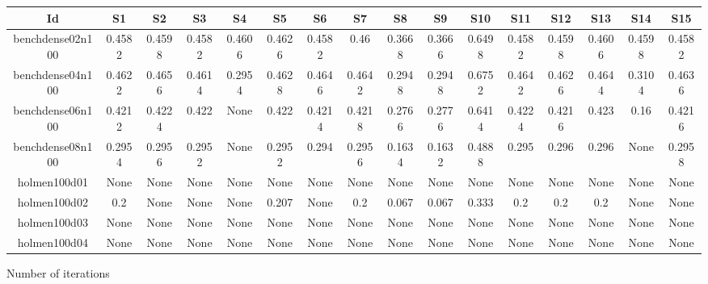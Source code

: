 \documentclass[landscape, 12pt]{report}
\begin{document}
\begin{tabular}{|c|c|c|c|c|c|c|c|c|c|c|c|c|c|c|c|}
\hline
\multicolumn{1}{|c|}{Id} & \multicolumn{1}{|c|}{S1} & \multicolumn{1}{|c|}{S2} & \multicolumn{1}{|c|}{S3} & \multicolumn{1}{|c|}{S4} & \multicolumn{1}{|c|}{S5} & \multicolumn{1}{|c|}{S6} & \multicolumn{1}{|c|}{S7} & \multicolumn{1}{|c|}{S8} & \multicolumn{1}{|c|}{S9} & \multicolumn{1}{|c|}{S10} & \multicolumn{1}{|c|}{S11} & \multicolumn{1}{|c|}{S12} & \multicolumn{1}{|c|}{S13} & \multicolumn{1}{|c|}{S14} & \multicolumn{1}{|c|}{S15}
\\
\hline
benchdense02n100 & 0.4582 & 0.4598 & 0.4582 & 0.4606 & 0.4626 & 0.4582 & 0.46 & 0.3668 & 0.3666 & 0.6498 & 0.4582 & 0.4598 & 0.4606 & 0.4598 & 0.4582
\\
benchdense04n100 & 0.4622 & 0.4656 & 0.4614 & 0.2954 & 0.4628 & 0.4646 & 0.4642 & 0.2948 & 0.2948 & 0.6752 & 0.4642 & 0.4626 & 0.4644 & 0.3104 & 0.4636
\\
benchdense06n100 & 0.4212 & 0.4224 & 0.422 & None & 0.422 & 0.4214 & 0.4218 & 0.2766 & 0.2776 & 0.6414 & 0.4224 & 0.4216 & 0.423 & 0.16 & 0.4216
\\
benchdense08n100 & 0.2954 & 0.2956 & 0.2952 & None & 0.2952 & 0.294 & 0.2956 & 0.1634 & 0.1632 & 0.4888 & 0.295 & 0.296 & 0.296 & None & 0.2958
\\
holmen100d01 & None & None & None & None & None & None & None & None & None & None & None & None & None & None & None
\\
holmen100d02 &  0.2 & None & None & None & 0.207 & None &  0.2 & 0.067 & 0.067 & 0.333 &  0.2 &  0.2 &  0.2 & None & None
\\
holmen100d03 & None & None & None & None & None & None & None & None & None & None & None & None & None & None & None
\\
holmen100d04 & None & None & None & None & None & None & None & None & None & None & None & None & None & None & None
\\
\hline 
 \end{tabular}

Number of iterations
\end{document}
